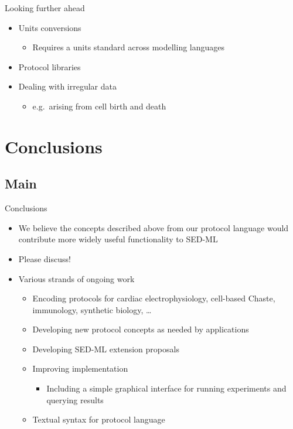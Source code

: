 \documentclass[t,xcolor={usenames,dvipsnames}]{beamer}
\newcommand{\subitem}[1]{\begin{itemize}[<.->]\item #1 \end{itemize}}
\begin{document}
\begin{frame}{Looking further ahead}
\begin{itemize}[<+->]
\item Units conversions
  \subitem{Requires a units standard across modelling languages}
\item Protocol libraries
\item Dealing with irregular data
  \subitem{e.g.\ arising from cell birth and death}
\end{itemize}
\end{frame}


\section{Conclusions}
\subsection*{Main}

\begin{frame}{Conclusions}
\begin{itemize}
\item We believe the concepts described above from our protocol
  language would contribute more widely useful functionality to SED-ML
\item Please discuss!
\item Various strands of ongoing work
  \begin{itemize}
  \item Encoding protocols for cardiac electrophysiology, cell-based Chaste, immunology, synthetic biology, \ldots
  \item Developing new protocol concepts as needed by applications
  \item Developing SED-ML extension proposals
  \item Improving implementation
    \subitem{Including a simple graphical interface for running experiments and querying results}
  \item Textual syntax for protocol language
  \end{itemize}
\end{itemize}
\end{frame}
\end{document}

